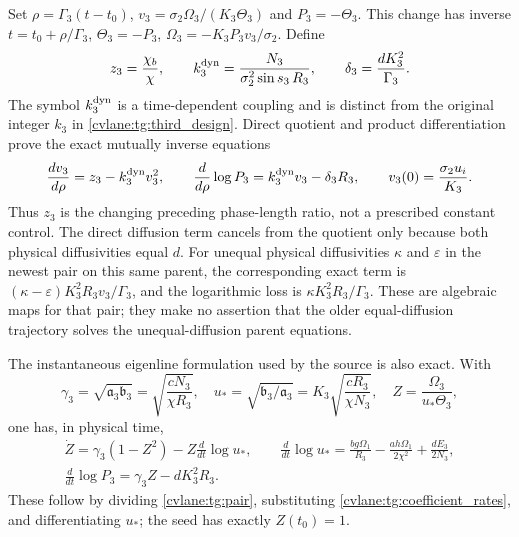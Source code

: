 Set $\rho=\Gamma_3(t-t_0)$,
$v_3=\sigma_2\Omega_3/(K_3\Theta_3)$ and
$P_3=-\Theta_3$. This change has inverse
$t=t_0+\rho/\Gamma_3$, $\Theta_3=-P_3$,
$\Omega_3=-K_3P_3v_3/\sigma_2$. Define
\begin{equation}\label{cvlane:tg:quotient_coefficients}
 z_3=\frac{\chi_b}{\chi},\qquad
 k_3^{\rm dyn}=\frac{N_3}{\sigma_2^2\sin s_3\,R_3},\qquad
 \delta_3=\frac{dK_3^2}{\Gamma_3}.
\end{equation}
The symbol $k_3^{\rm dyn}$ is a time-dependent coupling and is
distinct from the original integer $k_3$ in \eqref{cvlane:tg:third_design}.
Direct quotient and product differentiation prove the exact mutually
inverse equations
\begin{equation}\label{cvlane:tg:quotient}
 \frac{dv_3}{d\rho}=z_3-k_3^{\rm dyn}v_3^2,\qquad
 \frac{d}{d\rho}\log P_3=k_3^{\rm dyn}v_3-\delta_3R_3,
 \qquad
 v_3(0)=\frac{\sigma_2u_i}{K_3}.
\end{equation}
Thus $z_3$ is the changing preceding phase-length ratio, not a
prescribed constant control. The direct diffusion term cancels from
the quotient only because both physical diffusivities equal $d$.
For unequal physical diffusivities $\kappa$ and $\varepsilon$ in
the newest pair on this same parent, the corresponding exact term
is $(\kappa-\varepsilon)K_3^2R_3v_3/\Gamma_3$, and the logarithmic
loss is $\kappa K_3^2R_3/\Gamma_3$. These are algebraic maps for
that pair; they make no assertion that the older equal-diffusion
trajectory solves the unequal-diffusion parent equations.

The instantaneous eigenline formulation used by the source is also
exact. With
\[
 \gamma_3=\sqrt{\mathfrak a_3\mathfrak b_3}
          =\sqrt{\frac{cN_3}{\chi R_3}},\quad
 u_* =\sqrt{\mathfrak b_3/\mathfrak a_3}
          =K_3\sqrt{\frac{cR_3}{\chi N_3}},\quad
 Z=\frac{\Omega_3}{u_*\Theta_3},
\]
one has, in physical time,
\begin{equation}\label{cvlane:tg:eigenline}
\begin{gathered}
 \dot Z=\gamma_3(1-Z^2)-Z\frac d{dt}\log u_*,
 \qquad
 \frac d{dt}\log u_*
    =\frac{bg\Omega_1}{R_3}
       -\frac{ah\Omega_1}{2\chi^2}+\frac{dE_3}{2N_3},\\
 \frac d{dt}\log P_3=\gamma_3Z-dK_3^2R_3.
\end{gathered}
\end{equation}
These follow by dividing \eqref{cvlane:tg:pair}, substituting
\eqref{cvlane:tg:coefficient_rates}, and differentiating $u_*$; the seed
has exactly $Z(t_0)=1$.

